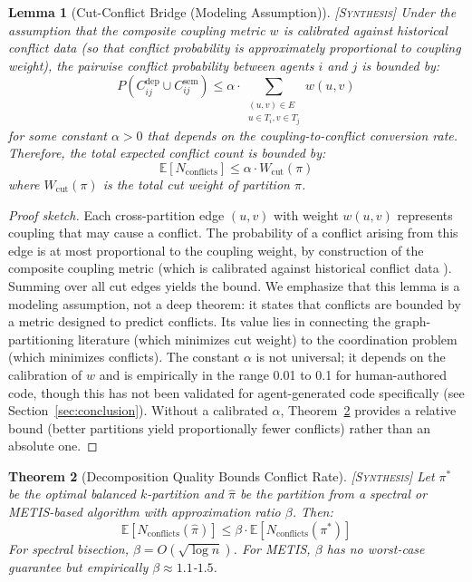 \documentclass[11pt, a4paper, copyright]{googledeepmind}
\newtheorem{theorem}{Theorem}[section]
\newtheorem{lemma}[theorem]{Lemma}
\newcommand{\synthesis}{\textsc{[Synthesis]}}
\begin{document}
\begin{lemma}[Cut-Conflict Bridge (Modeling Assumption)] \synthesis{}
\label{lem:bridge}
Under the assumption that the composite coupling metric $w$ is calibrated against historical conflict data (so that conflict probability is approximately proportional to coupling weight), the pairwise conflict probability between agents $i$ and $j$ is bounded by:
\begin{equation}
  P(C_{ij}^{\mathrm{dep}} \cup C_{ij}^{\mathrm{sem}}) \leq \alpha \cdot \sum_{\substack{(u,v) \in E \\ u \in T_i, v \in T_j}} w(u,v)
\end{equation}
for some constant $\alpha > 0$ that depends on the coupling-to-conflict conversion rate.
Therefore, the total expected conflict count is bounded by:
\begin{equation}
  \mathbb{E}[N_{\mathrm{conflicts}}] \leq \alpha \cdot W_{\mathrm{cut}}(\pi)
\end{equation}
where $W_{\mathrm{cut}}(\pi)$ is the total cut weight of partition $\pi$.
\end{lemma}

\begin{proof}[Proof sketch]
Each cross-partition edge $(u,v)$ with weight $w(u,v)$ represents coupling that may cause a conflict.
The probability of a conflict arising from this edge is at most proportional to the coupling weight, by construction of the composite coupling metric (which is calibrated against historical conflict data \citep{KasiSarma2013}).
Summing over all cut edges yields the bound.
We emphasize that this lemma is a modeling assumption, not a deep theorem: it states that conflicts are bounded by a metric designed to predict conflicts. Its value lies in connecting the graph-partitioning literature (which minimizes cut weight) to the coordination problem (which minimizes conflicts). The constant $\alpha$ is not universal; it depends on the calibration of $w$ and is empirically in the range 0.01 to 0.1 for human-authored code, though this has not been validated for agent-generated code specifically (see Section~\ref{sec:conclusion}). Without a calibrated $\alpha$, Theorem~\ref{thm:decomp-quality} provides a relative bound (better partitions yield proportionally fewer conflicts) rather than an absolute one.
\end{proof}

\begin{theorem}[Decomposition Quality Bounds Conflict Rate] \synthesis{}
\label{thm:decomp-quality}
Let $\pi^*$ be the optimal balanced $k$-partition and $\hat{\pi}$ be the partition from a spectral or METIS-based algorithm with approximation ratio $\beta$.
Then:
\begin{equation}
  \mathbb{E}[N_{\mathrm{conflicts}}(\hat{\pi})] \leq \beta \cdot \mathbb{E}[N_{\mathrm{conflicts}}(\pi^*)]
\end{equation}
For spectral bisection, $\beta = O(\sqrt{\log n})$.
For METIS, $\beta$ has no worst-case guarantee but empirically $\beta \approx 1.1$-$1.5$.
\end{theorem}
\end{document}
